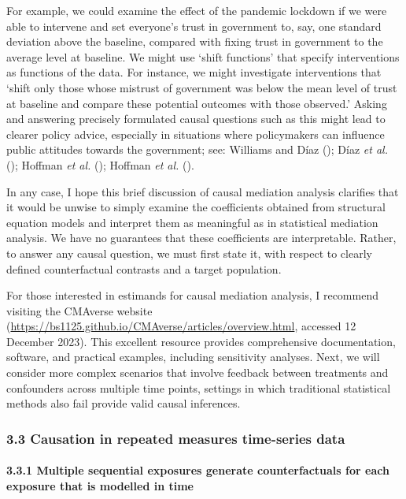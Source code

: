\documentclass[
  singlecolumn]{article}
\let\oldparagraph\paragraph
\renewcommand{\paragraph}[1]{\oldparagraph{#1}\mbox{}}
\begin{document}
For example, we could examine the effect of the pandemic lockdown if we
were able to intervene and set everyone's trust in government to, say,
one standard deviation above the baseline, compared with fixing trust in
government to the average level at baseline. We might use `shift
functions' that specify interventions as functions of the data. For
instance, we might investigate interventions that `shift only those
whose mistrust of government was below the mean level of trust at
baseline and compare these potential outcomes with those observed.'
Asking and answering precisely formulated causal questions such as this
might lead to clearer policy advice, especially in situations where
policymakers can influence public attitudes towards the government; see:
Williams and Díaz (); Díaz \emph{et
al.} (); Hoffman \emph{et al.}
(); Hoffman \emph{et al.}
().

In any case, I hope this brief discussion of causal mediation analysis
clarifies that it would be unwise to simply examine the coefficients
obtained from structural equation models and interpret them as
meaningful as in statistical mediation analysis. We have no guarantees
that these coefficients are interpretable. Rather, to answer any causal
question, we must first state it, with respect to clearly defined
counterfactual contrasts and a target population.

For those interested in estimands for causal mediation analysis, I
recommend visiting the CMAverse website
(\url{https://bs1125.github.io/CMAverse/articles/overview.html},
accessed 12 December 2023). This excellent resource provides
comprehensive documentation, software, and practical examples, including
sensitivity analyses. Next, we will consider more complex scenarios that
involve feedback between treatments and confounders across multiple time
points, settings in which traditional statistical methods also fail
provide valid causal inferences.

\subsubsection{3.3 Causation in repeated measures time-series
data}\label{causation-in-repeated-measures-time-series-data}

\paragraph{3.3.1 Multiple sequential exposures generate counterfactuals
for each exposure that is modelled in
time}\label{multiple-sequential-exposures-generate-counterfactuals-for-each-exposure-that-is-modelled-in-time}
\end{document}
